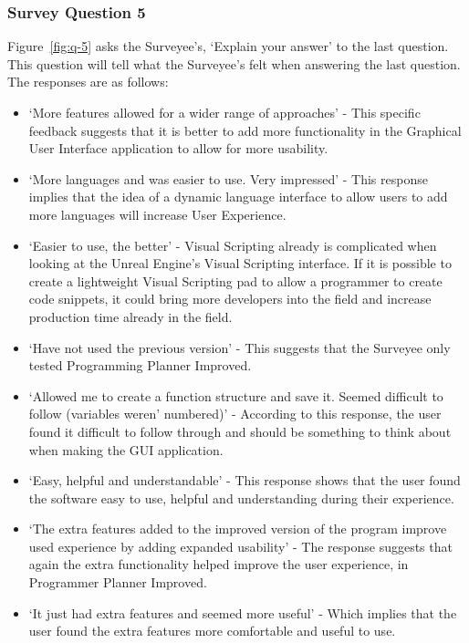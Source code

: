 \documentclass[conference]{IEEEtran}
\begin{document}
        \subsubsection{Survey Question 5} Figure~\ref{fig:q-5} asks the Surveyee's, `Explain your answer' to the last question. This question will tell what the Surveyee's felt when answering the last question. The responses are as follows:
        \begin{itemize}
          \item `More features allowed for a wider range of approaches' - This specific feedback suggests that it is better to add more functionality in the Graphical User Interface application to allow for more usability.
          \item `More languages and was easier to use. Very impressed' - This response implies that the idea of a dynamic language interface to allow users to add more languages will increase User Experience.
          \item `Easier to use, the better' - Visual Scripting already is complicated when looking at the Unreal Engine's Visual Scripting interface. If it is possible to create a lightweight Visual Scripting pad to allow a programmer to create code snippets, it could bring more developers into the field and increase production time already in the field.
          \item `Have not used the previous version' - This suggests that the Surveyee only tested Programming Planner Improved.
          \item `Allowed me to create a function structure and save it. Seemed difficult to follow (variables weren' numbered)' - According to this response, the user found it difficult to follow through and should be something to think about when making the GUI application.
          \item `Easy, helpful and understandable' - This response shows that the user found the software easy to use, helpful and understanding during their experience.
          \item `The extra features added to the improved version of the program improve used experience by adding expanded usability' - The response suggests that again the extra functionality helped improve the user experience, in Programmer Planner Improved.
          \item `It just had extra features and seemed more useful' - Which implies that the user found the extra features more comfortable and useful to use.
        \end{itemize}
\end{document}
